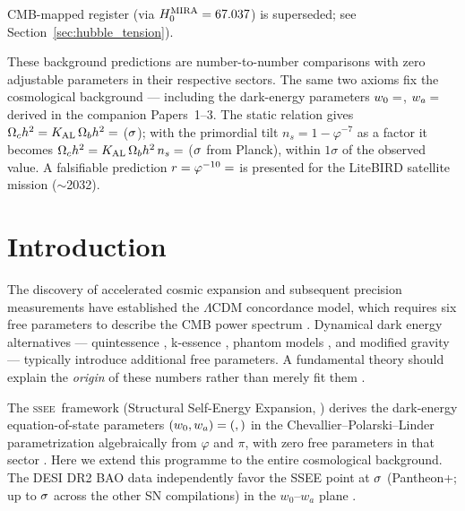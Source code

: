 \documentclass[12pt,a4paper]{article}
\newcommand{\SSEE}{\ifmmode\mathrm{SSEE}\else\textsc{ssee}\fi}
\renewenvironment{abstract}
  {\begin{center}\textbf{\abstractname}\end{center}\par\small\noindent\ignorespaces}
  {\par\medskip}
\begin{document}
\begin{abstract}
\begin{enumerate}
CMB-mapped register (via $H_0^{\rm MIRA}=67.037$) is superseded;
see Section~\ref{sec:hubble_tension}).
\end{enumerate}
These background predictions are number-to-number comparisons with zero adjustable parameters in their respective sectors.
The same two axioms fix the cosmological background --- including the
dark-energy parameters $w_0=\val{W0_d6}$, $w_a=\val{WA_d6}$ derived in the
companion Papers~1--3.
The static relation gives $\Omega_c h^2 = K_{\rm AL}\,\Omega_b h^2 = \val{wc_estatico_ssee_d4}$ ($\val{wc_estatico_ssee_sigma}\sigma$);
with the primordial tilt $n_s = 1-\varphi^{-7}$ as a factor it becomes
$\Omega_c h^2 = K_{\rm AL}\,\Omega_b h^2\,n_s = \val{OMEGA_C_H2_d6}$ ($\val{wc_ns_sigma}\sigma$ from Planck),
within $1\sigma$ of the observed value.
A falsifiable prediction $r = \varphi^{-10} = \val{R_TENSOR_d6}$ is presented for the
LiteBIRD satellite mission ($\sim$2032).
\end{abstract}

\clearpage
{\small\tableofcontents}
\clearpage

\section{Introduction}

The discovery of accelerated cosmic expansion
\citep{Riess1998,Perlmutter1999} and subsequent precision measurements
\citep{PlanckCollaboration2020a} have established the $\Lambda$CDM concordance
model, which requires six free parameters to describe the CMB power spectrum
\citep{Hu1997}.
Dynamical dark energy alternatives — quintessence \citep{Ratra1988,Copeland2006,Steinhardt1997,Zlatev1999},
k-essence \citep{ArmendarizPicon2001}, phantom models \citep{Caldwell2002},
and modified gravity \citep{Clifton2012} —
typically introduce additional free parameters.
A fundamental theory should explain the \emph{origin} of these numbers rather than
merely fit them \citep{Weinberg1987,Weinberg2013review}.

The \SSEE\ framework (Structural Self-Energy Expansion, \citep{AlmeidaSSEE2026genesis})
derives the dark-energy equation-of-state parameters
$(w_0, w_a) = (\val{W0_d6}, \val{WA_d6})$ in the Chevallier--Polarski--Linder
parametrization \citep{ChevallierPolarski2001,Linder2003}
algebraically from $\varphi$ and $\pi$, with zero free parameters in that
sector \citep{AlmeidaSSEE2026paper1,AlmeidaSSEE2026paper2,AlmeidaSSEE2026paper3}.
Here we extend this programme to the entire cosmological background.
The DESI DR2 BAO data \citep{desidr2_2025} independently favor the
SSEE point at $\val{p2_w0wa_ssee_ec26}\sigma$ (Pantheon+; up to $\val{p2_w0wa_ssee_ec27_d1}\sigma$ across the other SN compilations) in the $w_0$--$w_a$ plane \citep{AlmeidaSSEE2026paper2}.
\end{document}
